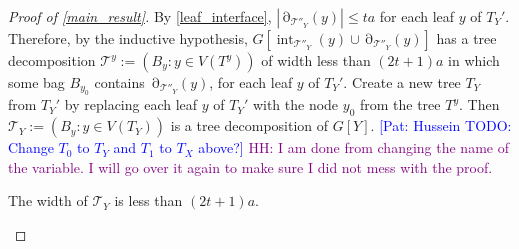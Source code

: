 \documentclass{patmorin}
\newcommand{\pat}[1]{\textcolor{Blue}{[Pat: #1]}}
\DeclareMathOperator{\interior}{int}
\DeclareMathOperator{\boundary}{\partial}
\newcommand{\hussein}[1]{\textcolor{purple}{HH: #1}}
\begin{document}
\begin{proof}[Proof of \cref{main_result}]
  By \cref{leaf_interface}, $|\boundary_{\mathcal{T}''_Y}(y)|\le ta$ for each leaf $y$ of $T_Y'$. Therefore, by the inductive hypothesis, $G[\interior_{\mathcal{T}''_Y}(y)\cup\boundary_{\mathcal{T}''_Y}(y)]$ has a tree decomposition $\mathcal{T}^y:=(B_y:y\in V(T^y))$ of width less than $(2t+1)a$ in which some bag $B_{y_0}$ contains  $\boundary_{\mathcal{T}''_Y}(y)$, for each leaf $y$ of $T_Y'$. Create a new tree $T_Y$ from $T_Y'$ by replacing each leaf $y$ of $T_Y'$ with the node $y_0$ from the tree $T^y$.  Then $\mathcal{T}_Y:=(B_y:y\in V(T_Y))$ is a tree decomposition of $G[Y]$.  \pat{Hussein TODO: Change $T_0$ to $T_Y$ and $T_1$ to $T_X$ above?}
  \hussein{I am done from changing the name of the variable. I will go over it again to make sure I did not mess with the proof.}
  \begin{clm}\label{treewidth_bound}
     The width of $\mathcal{T}_Y$ is less than $(2t+1)a$.
  \end{clm}
 



\end{proof}
\end{document}
